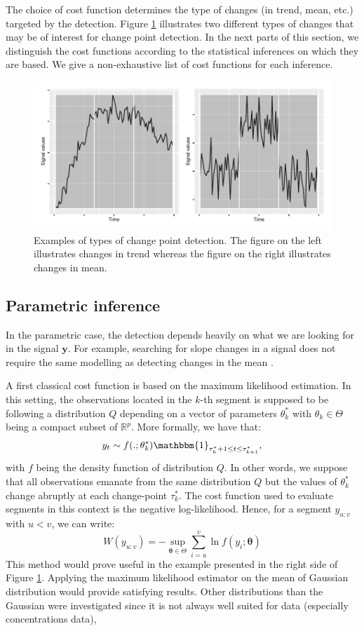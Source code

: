 The choice of cost function determines the type of changes (in trend, mean, etc.) targeted by the detection. Figure \ref{fig:ex_cp} illustrates two different types of changes that may be of interest for change point detection. In the next parts of this section, we distinguish the cost functions according to the statistical inferences on which they are based. We give a non-exhaustive list of cost functions for each inference.

\begin{figure}[ht]
    \centering
    \includegraphics{figs/Chap2/Ex_CP_cost.pdf}
    \caption{Examples of types of change point detection. The figure on the left illustrates changes in trend whereas the figure on the right illustrates changes in mean.}
    \label{fig:ex_cp}
\end{figure}

\subsection{Parametric inference}

In the parametric case, the detection depends heavily on what we are looking for in the signal $\bm y$. For example, searching for slope changes in a signal \cite{Bai1994,Fearnhead2018} does not require the same modelling as detecting changes in the mean \cite{Frick2014,chen2012parametric}. 

A first classical cost function is based on the maximum likelihood estimation. In this setting, the observations located in the $k$-th segment is supposed to be following a distribution $Q$ depending on a vector of parameters $\theta^*_k$ with $\theta_k \in \Theta$ being a compact subset of $\mathbb{R}^p$. More formally, we have that:
$$y_t \sim f(.;\theta^*_k)\mathbbm{1}_{\tau^*_{k}+1\leq t \leq \tau^*_{k+1}},$$
with $f$ being the density function of distribution $Q$. In other words, we suppose that all observations emanate from the same distribution $Q$ but the values of $\theta^*_k$ change abruptly at each change-point $\tau^*_k$. The cost function used to evaluate segments in this context is the negative log-likelihood. Hence, for a segment $y_{u:v}$ with $u < v$, we can write:  
$$W(y_{u:v}) = -\sup_{\bm \theta \in \Theta} \sum_{i = u}^{v} \ln f(y_i; \bm \theta)$$
This method would prove useful in the example presented in the right side of Figure \ref{fig:ex_cp}. Applying the maximum likelihood estimator on the mean of Gaussian distribution would provide satisfying results. Other distributions than the Gaussian were investigated since it is not always well suited for data (especially concentrations data),  

